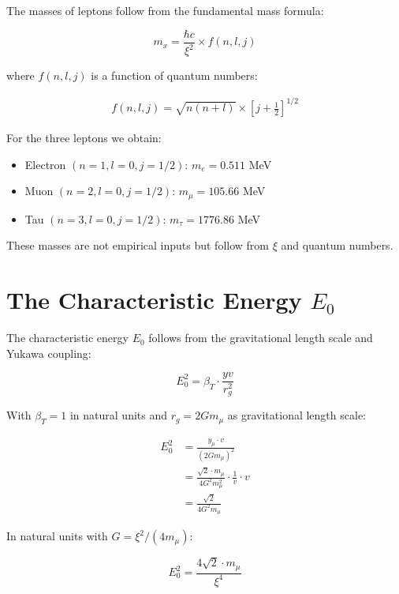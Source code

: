 \documentclass[12pt,a4paper]{article}
\begin{document}
	The masses of leptons follow from the fundamental mass formula:
	
	\begin{equation}
		m_x = \frac{\hbar c}{\xi^2} \times f(n, l, j)
	\end{equation}
	
	where $f(n, l, j)$ is a function of quantum numbers:
	
	\begin{align}
		f(n, l, j) = \sqrt{n(n+l)} \times \left[j + \frac{1}{2}\right]^{1/2}
	\end{align}
	
	For the three leptons we obtain:
	
	\begin{itemize}
		\item Electron $(n=1, l=0, j=1/2)$: $m_e = 0.511$ MeV
		\item Muon $(n=2, l=0, j=1/2)$: $m_\mu = 105.66$ MeV
		\item Tau $(n=3, l=0, j=1/2)$: $m_\tau = 1776.86$ MeV
	\end{itemize}
	
	These masses are not empirical inputs but follow from $\xi$ and quantum numbers.
	
	\section{The Characteristic Energy $E_0$}
	
	The characteristic energy $E_0$ follows from the gravitational length scale and Yukawa coupling:
	
	\begin{equation}
		E_0^2 = \beta_T \cdot \frac{yv}{r_g^2}
	\end{equation}
	
	With $\beta_T = 1$ in natural units and $r_g = 2Gm_\mu$ as gravitational length scale:
	
	\begin{align}
		E_0^2 &= \frac{y_\mu \cdot v}{(2Gm_\mu)^2}\\
		&= \frac{\sqrt{2} \cdot m_\mu}{4G^2 m_\mu^2} \cdot \frac{1}{v} \cdot v\\
		&= \frac{\sqrt{2}}{4G^2 m_\mu}
	\end{align}
	
	In natural units with $G = \xi^2/(4m_\mu)$:
	
	\begin{equation}
		E_0^2 = \frac{4\sqrt{2} \cdot m_\mu}{\xi^4}
	\end{equation}
	
\end{document}
